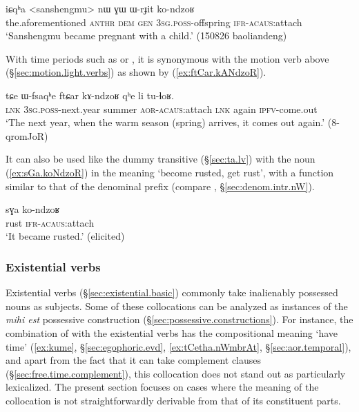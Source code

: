  \begin{exe}
\ex \label{ex:WrJit.konzdoR}
\gll iɕqʰa <sanshengmu> nɯ ɣɯ ɯ-rɟit ko-ndzoʁ \\
the.aforementioned  \textsc{anthr} \textsc{dem} \textsc{gen} \textsc{3sg}.\textsc{poss}-offspring \textsc{ifr}-\textsc{acaus}:attach \\
\glt `Sanshengmu became pregnant with a child.' (150826 baoliandeng)
 \end{exe} 
  
With time periods such as  or , it is synonymous with the motion verb  above (§\ref{sec:motion.light.verbs}) as shown by (\ref{ex:ftCar.kANdzoR}).
  
\begin{exe}
\ex \label{ex:ftCar.kANdzoR}
\gll  tɕe ɯ-fsaqʰe ftɕar kɤ-ndzoʁ qʰe li tu-ɬoʁ. \\
\textsc{lnk} \textsc{3sg}.\textsc{poss}-next.year summer \textsc{aor}-\textsc{acaus}:attach \textsc{lnk} again \textsc{ipfv}-come.out \\
\glt  `The next year, when the warm season (spring) arrives, it comes out again.' (8-qromJoR)
 \end{exe}  

It can also be used like the dummy transitive  (§\ref{sec:ta.lv}) with the noun  (\ref{ex:sGa.koNdzoR}) in the meaning `become rusted, get rust', with a function similar to that of the  denominal prefix (compare , §\ref{sec:denom.intr.nW}).

\begin{exe}
\ex \label{ex:sGa.koNdzoR}
\gll sɣa ko-ndzoʁ \\
rust \textsc{ifr}-\textsc{acaus}:attach  \\
\glt `It became rusted.' (elicited)
\end{exe}  

 
\subsubsection{Existential verbs} \label{sec:existential.light.verbs}
Existential verbs (§\ref{sec:existential.basic}) commonly take inalienably possessed nouns as subjects. Some of these collocations can be analyzed as instances of the \textit{mihi est} possessive construction (§\ref{sec:possessive.constructions}). For instance, the combination of  with the existential verbs has the compositional meaning `have time' (\ref{ex:kume}, §\ref{sec:egophoric.evd}, \ref{ex:tCetha.nWmbrAt}, §\ref{sec:aor.temporal}), and apart from the fact that it can take complement clauses (§\ref{sec:free.time.complement}), this collocation does not stand out as particularly lexicalized. The present section focuses on cases where the meaning of the collocation is not straightforwardly derivable from that of its constituent parts.

